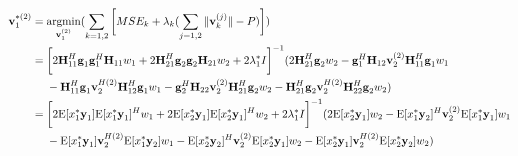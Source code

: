 \documentclass[11pt, oneside]{article}   	%
\begin{document}
\begin{align*}
\textbf{v}^{*(2)}_{1}  &= \operatornamewithlimits{argmin}_{\textbf{v}^{(2)}_{1}}	(\displaystyle\sum_{k=1,2} 	\bigg[	MSE_{k}	+	\lambda_{k}	(\displaystyle\sum_{j=1,2}	\|	\textbf{v}^{(j)}_{k}	\|	-P	)	\bigg])	\\
			       &=\bigg[ 2	\textbf{H}^{H}_{11}	\textbf{g}_{1}	\textbf{g}^{H}_{1}		\textbf{H}_{11}	w_1
				   +	2	\textbf{H}^{H}_{21}	\textbf{g}_{2}	\textbf{g}_{2}		\textbf{H}_{21}	w_2	+2	\lambda^{*}_1 I
				   \bigg]^{-1} 
				   (
				   2	\textbf{H}^{H}_{21}	\textbf{g}_{2}	w_2	
				   -\textbf{g}^{H}_{1}	\textbf{H}_{12}	\textbf{v}^{(2)}_{2} 	\textbf{H}^{H}_{11}	\textbf{g}_{1}	w_1	\\
				   &\ \ \ \ 
				   -	\textbf{H}^{H}_{11}	\textbf{g}_{1}	\textbf{v}^{H(2)}_{2}	\textbf{H}^{H}_{12}	\textbf{g}_{1}	w_1
				   -	\textbf{g}^{H}_{2}	\textbf{H}_{22}	\textbf{v}^{(2)}_{2} 	\textbf{H}^{H}_{21}	\textbf{g}_{2}	w_2
				   -	\textbf{H}^{H}_{21}	\textbf{g}_{2}	\textbf{v}^{H(2)}_{2}	\textbf{H}^{H}_{22}	\textbf{g}_{2}	w_2
				   )\\
			      &=\bigg[	2	\mathrm{E}[x^*_1	\textbf{y}_1]	\mathrm{E}[x^*_1	\textbf{y}_1]^H	w_1
			      			+	2	\mathrm{E}[x^*_2	\textbf{y}_1]	\mathrm{E}[x^*_2	\textbf{y}_1]^H	w_2	+2	\lambda^{*}_1 I
			      	  \bigg]^{-1} 
				  (2	\mathrm{E}[x^*_2	\textbf{y}_1]	w_2
				  -\mathrm{E}[x^*_1	\textbf{y}_2]^H	\textbf{v}^{(2)}_{2} 	\mathrm{E}[x^*_1	\textbf{y}_1]	w_1	\\
				  &\ \ \ \ 	
				  -\mathrm{E}[x^*_1	\textbf{y}_1]	\textbf{v}^{H(2)}_{2} 	\mathrm{E}[x^*_1	\textbf{y}_2]	w_1	
				  -\mathrm{E}[x^*_2	\textbf{y}_2]^H	\textbf{v}^{(2)}_{2} 	\mathrm{E}[x^*_2	\textbf{y}_1]	w_2
				   -\mathrm{E}[x^*_2	\textbf{y}_1]	\textbf{v}^{H(2)}_{2} 	\mathrm{E}[x^*_2	\textbf{y}_2]	w_2	
				   )
\end{align*}
\end{document}
